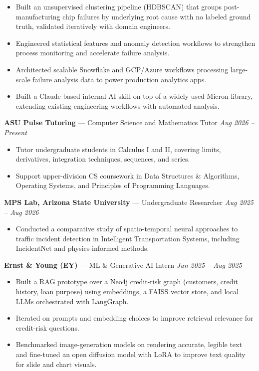 \documentclass[a4paper,8pt]{extarticle}
\begin{document}
\begin{itemize}
\item Built an unsupervised clustering pipeline (HDBSCAN) that groups post-manufacturing chip failures by underlying root cause with no labeled ground truth, validated iteratively with domain engineers.
\item Engineered statistical features and anomaly detection workflows to strengthen process monitoring and accelerate failure analysis.
\item Architected scalable Snowflake and GCP/Azure workflows processing large-scale failure analysis data to power production analytics apps.
\item Built a Claude-based internal AI skill on top of a widely used Micron library, extending existing engineering workflows with automated analysis.
\end{itemize}

\noindent
\textbf{ASU Pulse Tutoring} --- Computer Science and Mathematics Tutor
\hfill \textit{Aug 2026 -- Present}

\begin{itemize}
\item Tutor undergraduate students in Calculus I and II, covering limits, derivatives, integration techniques, sequences, and series.
\item Support upper-division CS coursework in Data Structures \& Algorithms, Operating Systems, and Principles of Programming Languages.
\end{itemize}

\noindent
\textbf{MPS Lab, Arizona State University} --- Undergraduate Researcher
\hfill \textit{Aug 2025 -- Aug 2026}

\begin{itemize}
\item Conducted a comparative study of spatio-temporal neural approaches to traffic incident detection in Intelligent Transportation Systems, including IncidentNet and physics-informed methods.
\end{itemize}

\noindent
\textbf{Ernst \& Young (EY)} --- ML \& Generative AI Intern
\hfill \textit{Jun 2025 -- Aug 2025}

\begin{itemize}
\item Built a RAG prototype over a Neo4j credit-risk graph (customers, credit history, loan purpose) using embeddings, a FAISS vector store, and local LLMs orchestrated with LangGraph.
\item Iterated on prompts and embedding choices to improve retrieval relevance for credit-risk questions.
\item Benchmarked image-generation models on rendering accurate, legible text and fine-tuned an open diffusion model with LoRA to improve text quality for slide and chart visuals.
\end{itemize}
\end{document}
